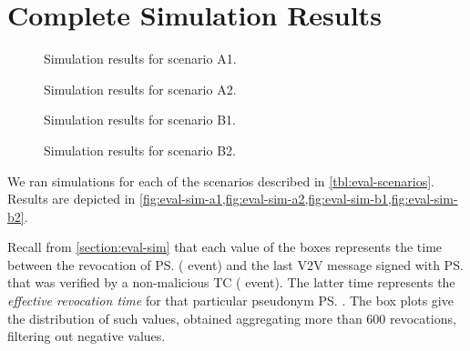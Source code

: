 \section{Complete Simulation Results}
\label{appendix:simulation}



\begin{figure}[t]
    \hspace*{-0.3cm}
    \resizebox{1.05\linewidth}{!} {
      
    } \caption{Simulation results for scenario A1.}
    \label{fig:eval-sim-a1}
\end{figure}

\begin{figure}[t]
    \hspace*{-0.3cm}
    \resizebox{1.05\linewidth}{!} {
      
    } \caption{Simulation results for scenario A2.}
    \label{fig:eval-sim-a2}
\end{figure}

\begin{figure}[t]
    \hspace*{-0.3cm}
    \resizebox{1.05\linewidth}{!} {
      
    } \caption{Simulation results for scenario B1.}
    \label{fig:eval-sim-b1}
\end{figure}

\begin{figure}[t]
    \hspace*{-0.3cm}
    \resizebox{1.05\linewidth}{!} {
      
    } \caption{Simulation results for scenario B2.}
    \label{fig:eval-sim-b2}
\end{figure}

We ran simulations for each of the scenarios described in
\cref{tbl:eval-scenarios}. Results are depicted in
\cref{fig:eval-sim-a1,fig:eval-sim-a2,fig:eval-sim-b1,fig:eval-sim-b2}.

Recall from \cref{section:eval-sim} that each value of the boxes represents the
time between the revocation of \ps{} (\funcrevokedaa{} event) and the last
\ac{V2V} message signed with \ps{} that was verified by a non-malicious \ac{TC}
(\funcverify{} event). The latter time represents the \emph{effective revocation
time} for that particular pseudonym \ps. The box plots give the distribution of
such values, obtained aggregating more than 600 revocations, filtering out
negative values.

